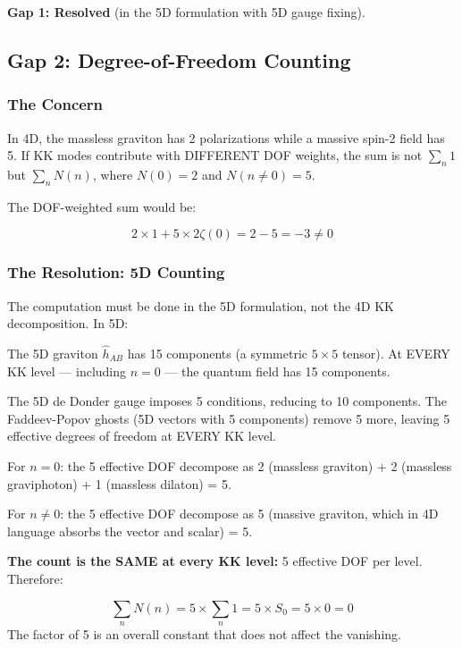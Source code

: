 \documentclass[aps,prd,preprint,superscriptaddress,longbibliography,floatfix]{revtex4-2}
\theoremstyle{remark}
\begin{document}
\textbf{Gap 1: Resolved} (in the 5D formulation with 5D gauge fixing).



\subsection{Gap 2: Degree-of-Freedom Counting}


\subsubsection{The Concern}

In 4D, the massless graviton has 2 polarizations while a massive spin-2 field has 5. If KK modes contribute with DIFFERENT DOF weights, the sum is not $\sum_n 1$ but $\sum_n N(n)$, where $N(0) = 2$ and $N(n\neq0) = 5$.

The DOF-weighted sum would be:


\begin{equation}
    2 \times 1 + 5 \times 2\zeta(0) = 2 - 5 = -3 \neq 0
\end{equation}

\subsubsection{The Resolution: 5D Counting}

The computation must be done in the 5D formulation, not the 4D KK decomposition. In 5D:

The 5D graviton $\hat{h}_{AB}$ has 15 components (a symmetric $5\times5$ tensor). At EVERY KK level --- including $n = 0$ --- the quantum field has 15 components.

The 5D de Donder gauge imposes 5 conditions, reducing to 10 components. The Faddeev-Popov ghosts (5D vectors with 5 components) remove 5 more, leaving 5 effective degrees of freedom at EVERY KK level.

For $n = 0$: the 5 effective DOF decompose as 2 (massless graviton) + 2 (massless graviphoton) + 1 (massless dilaton) = 5.

For $n \neq 0$: the 5 effective DOF decompose as 5 (massive graviton, which in 4D language absorbs the vector and scalar) = 5.

\textbf{The count is the SAME at every KK level:} 5 effective DOF per level. Therefore:


\begin{equation}
    \sum_n N(n) = 5 \times \sum_n 1 = 5 \times S_{0} = 5 \times 0 = 0
\end{equation}
The factor of 5 is an overall constant that does not affect the vanishing.
\end{document}

